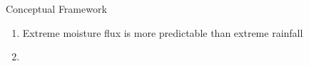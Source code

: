 \begin{block}{Conceptual Framework}
    \begin{enumerate}
        \item Extreme moisture flux is more predictable than extreme rainfall  \cite[][show for West Coast US]{Lavers2016}
        \item 
    \end{enumerate}
\end{block}
